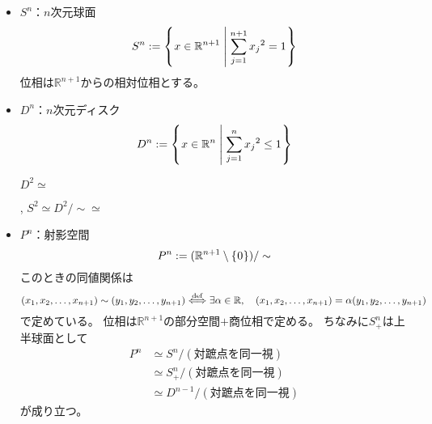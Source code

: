\documentclass[uplatex]{jsarticle}
\begin{document}
\begin{itemize}
  \vspace{-0.5\baselineskip}
  \item $S^{n}$：$n$次元球面
  \begin{equation}
    S^{n} := \Set{\hspace{-1.8pt} x \in \mathbb{R}^{n+1} | \sum_{j=1}^{n+1} {x_{j}}^{2} = 1 \hspace{-1.8pt}}
  \end{equation}
  位相は$\mathbb{R}^{n+1}$からの相対位相とする。

  \item $D^{n}$：$n$次元ディスク
  \begin{equation}
    D^{n} := \Set{\hspace{-1.8pt} x \in \mathbb{R}^{n} | \sum_{j=1}^{n} {x_{j}}^{2} \le 1 \hspace{-1.8pt}}
  \end{equation}

  \begin{center}
    $D^{2} \simeq$
      , \quad $S^{2} \simeq {D^{2} / \sim} \simeq$
  \end{center}

  \item $P^{n}$：射影空間
  \begin{equation}
    P^{n} := (\mathbb{R}^{n+1} \setminus \Set{\hspace{-1.8pt} 0 \hspace{-1.8pt}}) / \sim
  \end{equation}
  このときの同値関係は
  \begin{equation}
    (x_{1},x_{2},\dots,x_{n+1}) \sim (y_{1},y_{2},\dots,y_{n+1}) \overset{\mathrm{def}}{\Longleftrightarrow} \exists \alpha \in \mathbb{R}, \quad (x_{1},x_{2},\dots,x_{n+1}) = \alpha (y_{1},y_{2},\dots,y_{n+1})
  \end{equation}
  で定めている。
  位相は$\mathbb{R}^{n+1}$の部分空間$+$商位相で定める。
  ちなみに$S_{+}^{n}$は上半球面として
  \begin{align}
    P^{n} &\simeq S^{n} / (\text{対蹠点を同一視}) \\
    &\simeq S_{+}^{n} / (\text{対蹠点を同一視}) \\
    &\simeq D^{n-1} / (\text{対蹠点を同一視})
  \end{align}
  が成り立つ。


\end{itemize}
\end{document}
